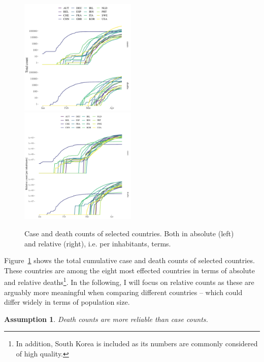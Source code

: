 \documentclass[fullpage,a4paper]{article}
\newcommand{\fig}[1]{Figure~\ref{fig:#1}}
\newtheorem{hypothesis}{Assumption}
\begin{document}
\begin{figure}
  \includegraphics[width=0.495\textwidth]{../figs/ecdc_raw_absolute.pdf}
  \includegraphics[width=0.495\textwidth]{../figs/ecdc_raw_relative.pdf}
  \caption{\label{fig:raw_data} Case and death counts of selected
    countries. Both in absolute (left) and relative (right), i.e. per
    inhabitants, terms.}
\end{figure}
\fig{raw_data} shows the total cumulative case and death counts of
selected countries. These countries are among the eight most effected
countries in terms of absolute and relative deaths\footnote{In
  addition, South Korea is included as its numbers are commonly
  considered of high quality.}. In the following, I will focus on
relative counts as these are arguably more meaningful when comparing
different countries -- which could differ widely in terms of
population size.

\begin{hypothesis}
  \label{hyp:count}
  Death counts are more reliable than case counts.
\end{hypothesis}
\end{document}
